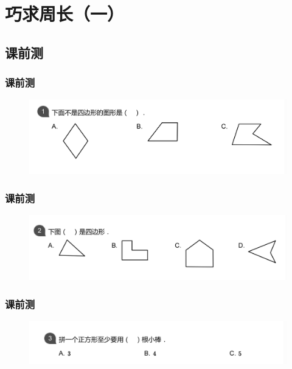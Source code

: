 \section{巧求周长（一）}

\subsection{课前测}
\begin{frame}
    \frametitle{课前测}

    \begin{figure}[H] %
        \centering %
        \includegraphics[width=1\textwidth]{./pics/Chapter_1/1.png} %
    \end{figure}
    
\end{frame}

\begin{frame}
    \frametitle{课前测}
    \begin{figure}[H] 
        \centering
        \includegraphics[width=1\textwidth]{./pics/Chapter_1/2.png}
    \end{figure}
\end{frame}

\begin{frame}
    \frametitle{课前测}
    \begin{figure}[H] 
        \centering
        \includegraphics[width=1\textwidth]{./pics/Chapter_1/3.png}
    \end{figure}
\end{frame}

